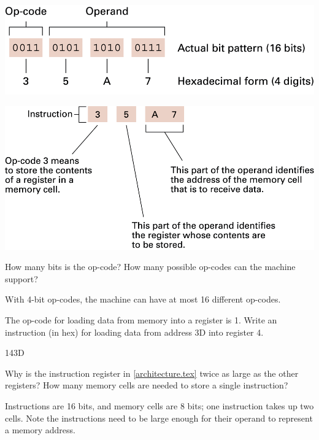 

\begin{multicols}{2}
\includegraphics[width=\linewidth]{opcode1.png}

\columnbreak

\includegraphics[width=\linewidth]{opcode2.png}
\end{multicols}




\Q How many bits is the op-code? How many possible op-codes can the machine support?

\begin{answer}
With 4-bit op-codes, the machine can have at most 16 different op-codes.
\end{answer}


\Q The op-code for loading data from memory into a register is 1.
Write an instruction (in hex) for loading data from address 3D into register 4.

\begin{answer}[3em]
143D
\end{answer}


\Q Why is the instruction register in \ref{architecture.tex} twice as large as the other registers?
How many memory cells are needed to store a single instruction?

\begin{answer}
Instructions are 16 bits, and memory cells are 8 bits; one instruction takes up two cells.
Note the instructions need to be large enough for their operand to represent a memory address.
\end{answer}
